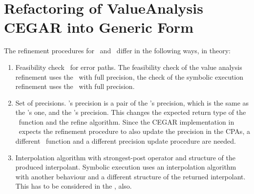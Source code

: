 \section{Refactoring of ValueAnalysis CEGAR into Generic Form}
The refinement procedures for \ and \symbolicExecutionCPA\ differ in the following ways, in theory:
\begin{enumerate}
\item
Feasibility check \isFeasibleFunc\ for error paths.
The feasibility check of the value analysis refinement uses the \ with full precision, the check of the symbolic execution refinement uses the \symbolicExecutionCPA\ with full precision.

\item
Set of precisions. \SymbolicExecutionCPA's precision is a pair of the \symbolicValueAnalysisCPA's precision, which is the same as the 's one, and the \constraintsCPA's precision. This changes the expected return type of the \extractPrecisionFunc\ function and the refine algorithm.
Since the CEGAR implementation in \cpaChecker\ expects the refinement procedure to also update the precision in the CPAs, a different \extractPrecisionFunc\ function and a different
precision update procedure are needed.

\item
Interpolation algorithm with strongest-post operator and structure of the produced interpolant.
Symbolic execution uses an interpolation algorithm with another behaviour and a different structure of the returned interpolant.
This has to be considered in the \extractPrecisionFunc, also.
\end{enumerate}

